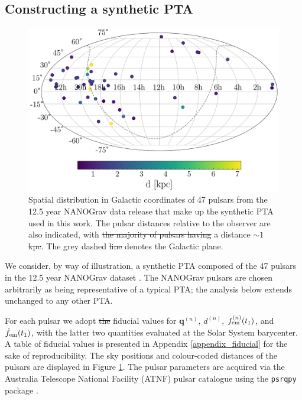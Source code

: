 \documentclass[fleqn,usenatbib,useAMS]{mnras}
\providecommand{\DIFadd}[1]{{\protect\color{blue}\uwave{#1}}} %
\providecommand{\DIFdel}[1]{{\protect\color{red}\sout{#1}}}                      %
\providecommand{\DIFaddbegin}{} %
\providecommand{\DIFaddend}{} %
\providecommand{\DIFdelbegin}{} %
\providecommand{\DIFdelend}{} %
\providecommand{\DIFaddFL}[1]{\DIFadd{#1}} %
\providecommand{\DIFdelFL}[1]{\DIFdel{#1}} %
\providecommand{\DIFaddbeginFL}{} %
\providecommand{\DIFaddendFL}{} %
\providecommand{\DIFdelbeginFL}{} %
\providecommand{\DIFdelendFL}{} %
\newcommand{\DIFscaledelfig}{0.5}
\newlength{\DIFdelgraphicswidth} %
\newlength{\DIFdelgraphicsheight} %
\newcommand{\DIFaddincludegraphics}[2][]{{\color{blue}\fbox{\DIFOincludegraphics[#1]{#2}}}} %
\newcommand{\DIFdelincludegraphics}[2][]{%
\sbox{\DIFdelgraphicsbox}{\DIFOincludegraphics[#1]{#2}}%
\settoboxwidth{\DIFdelgraphicswidth}{\DIFdelgraphicsbox} %
\settoboxtotalheight{\DIFdelgraphicsheight}{\DIFdelgraphicsbox} %
\scalebox{\DIFscaledelfig}{%
\parbox[b]{\DIFdelgraphicswidth}{\usebox{\DIFdelgraphicsbox}\\[-\baselineskip] \rule{\DIFdelgraphicswidth}{0em}}\llap{\resizebox{\DIFdelgraphicswidth}{\DIFdelgraphicsheight}{%
\setlength{\unitlength}{\DIFdelgraphicswidth}%
\begin{picture}(1,1)%
\thicklines\linethickness{2pt} %
{\color[rgb]{1,0,0}\put(0,0){\framebox(1,1){}}}%
{\color[rgb]{1,0,0}\put(0,0){\line( 1,1){1}}}%
{\color[rgb]{1,0,0}\put(0,1){\line(1,-1){1}}}%
\end{picture}%
}\hspace*{3pt}}} %
} %
\DeclareRobustCommand{\DIFaddbegin}{\DIFOaddbegin \let\includegraphics\DIFaddincludegraphics} %
\DeclareRobustCommand{\DIFaddend}{\DIFOaddend \let\includegraphics\DIFOincludegraphics} %
\DeclareRobustCommand{\DIFdelbegin}{\DIFOdelbegin \let\includegraphics\DIFdelincludegraphics} %
\DeclareRobustCommand{\DIFdelend}{\DIFOaddend \let\includegraphics\DIFOincludegraphics} %
\DeclareRobustCommand{\DIFaddbeginFL}{\DIFOaddbeginFL \let\includegraphics\DIFaddincludegraphics} %
\DeclareRobustCommand{\DIFaddendFL}{\DIFOaddendFL \let\includegraphics\DIFOincludegraphics} %
\DeclareRobustCommand{\DIFdelbeginFL}{\DIFOdelbeginFL \let\includegraphics\DIFdelincludegraphics} %
\DeclareRobustCommand{\DIFdelendFL}{\DIFOaddendFL \let\includegraphics\DIFOincludegraphics} %
\begin{document}
\subsection{Constructing a synthetic PTA}\label{sec:synt_pta}
\begin{figure}
	\includegraphics[width=\columnwidth]{images/pulsar_distribution}
	\caption{Spatial distribution in Galactic coordinates of 47 pulsars from the 12.5 year NANOGrav data release that make up the synthetic PTA used in this work. The pulsar distances relative to the observer are also indicated, with \DIFdelbeginFL \DIFdelFL{the majority of pulsars having }\DIFdelendFL a distance \DIFdelbeginFL \DIFdelFL{$\sim 1$ kpc}\DIFdelendFL \DIFaddbeginFL \DIFaddFL{$\leq 2 \, {\rm kpc}$ for $38$ pulsars}\DIFaddendFL . The grey dashed \DIFdelbeginFL \DIFdelFL{line }\DIFdelendFL \DIFaddbeginFL \DIFaddFL{curve }\DIFaddendFL denotes the Galactic plane.}
	\label{fig:pulsar_distrib}
\end{figure}
We consider, by way of illustration, a synthetic PTA composed of the 47 pulsars in the 12.5 year NANOGrav dataset \citep{2020ApJ...905L..34A}. The NANOGrav pulsars are chosen arbitrarily as being representative of a typical PTA; the analysis below extends unchanged to any other PTA. \DIFaddbegin \newline 

\DIFaddend For each pulsar we adopt \DIFdelbegin \DIFdel{the }\DIFdelend fiducial values for ${\boldsymbol{q}}^{(n)}$, $d^{(n)}$, $f_{\rm em}^{(n)}(t_1)$, and $\dot{f}_{\rm em}(t_1)$, with the latter two quantities evaluated at the Solar System barycenter. A table of fiducial values is presented in Appendix \ref{appendix_fiducial} for the sake of reproducibility. The sky positions and colour-coded distances of the pulsars are displayed in Figure \ref{fig:pulsar_distrib}. The pulsar parameters are acquired via the Australia Telescope National Facility (ATNF) pulsar catalogue \citep{Manchester2005} using the \texttt{psrqpy} package \citep{psrqpy}. \DIFaddbegin \newline 
\end{document}
